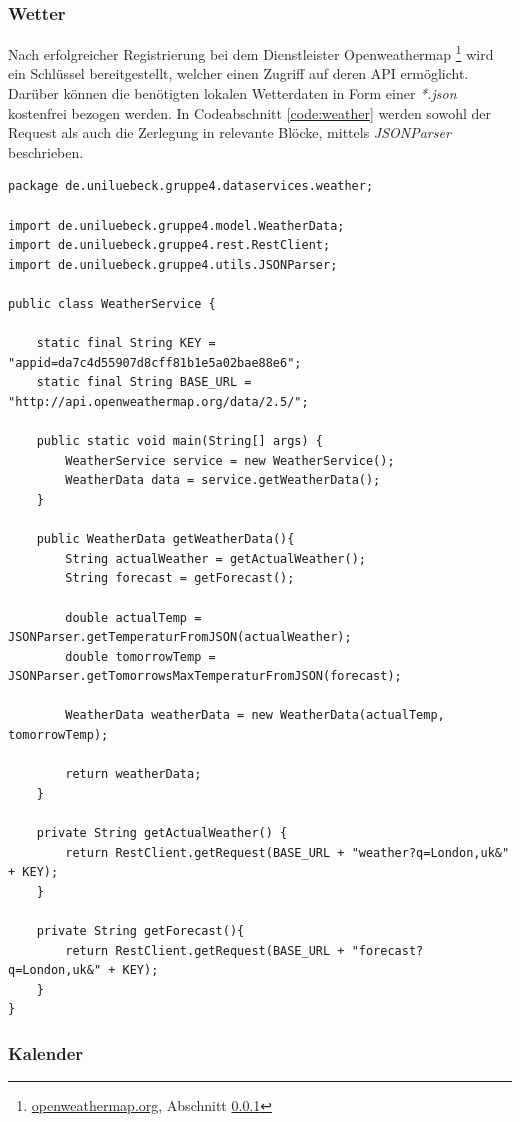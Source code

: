 \subsubsection{Wetter}
\label{subsubsec:weather}

Nach erfolgreicher Registrierung bei dem Dienstleister Openweathermap \footnote{\url{openweathermap.org}, Abschnitt \ref{subsubsec:weather}} wird ein Schlüssel bereitgestellt, welcher einen Zugriff auf deren API ermöglicht. Darüber können die benötigten lokalen Wetterdaten in Form einer \textit{*.json} kostenfrei bezogen werden. In Codeabschnitt \ref{code:weather} werden sowohl der Request als auch die Zerlegung in relevante Blöcke, mittels \textit{JSONParser} beschrieben.

\begin{lstlisting}[float=htb,caption={WeatherService Klasse zum Abrufen der aktuellen Wetterlage sowie Vorhersage für eine Region},label=code:weather]
package de.uniluebeck.gruppe4.dataservices.weather;

import de.uniluebeck.gruppe4.model.WeatherData;
import de.uniluebeck.gruppe4.rest.RestClient;
import de.uniluebeck.gruppe4.utils.JSONParser;

public class WeatherService {

	static final String KEY = "appid=da7c4d55907d8cff81b1e5a02bae88e6";
	static final String BASE_URL = "http://api.openweathermap.org/data/2.5/";
	
	public static void main(String[] args) {
		WeatherService service = new WeatherService();
		WeatherData data = service.getWeatherData();
	}
	
	public WeatherData getWeatherData(){
		String actualWeather = getActualWeather();
		String forecast = getForecast();
		
		double actualTemp = JSONParser.getTemperaturFromJSON(actualWeather);
		double tomorrowTemp = JSONParser.getTomorrowsMaxTemperaturFromJSON(forecast);
		
		WeatherData weatherData = new WeatherData(actualTemp, tomorrowTemp);
		
		return weatherData;
	}
	
	private String getActualWeather() {
		return RestClient.getRequest(BASE_URL + "weather?q=London,uk&" + KEY);
	}
	
	private String getForecast(){
		return RestClient.getRequest(BASE_URL + "forecast?q=London,uk&" + KEY);
	}
}
\end{lstlisting}


\subsubsection{Kalender}
\label{subsubsec:calendar}

